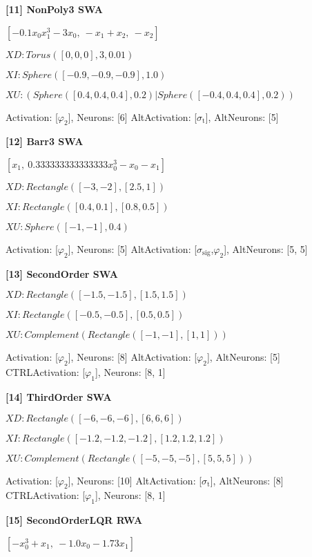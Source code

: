 \textbf{ [11] NonPoly3 SWA }

$\left[ - 0.1 x_{0} x_{1}^{3} - 3 x_{0}, \  - x_{1} + x_{2}, \  - x_{2}\right]$ 
 
 $XD: Torus([0, 0, 0], 3, 0.01) $

$XI: Sphere([-0.9, -0.9, -0.9], 1.0) $

$XU: (Sphere([0.4, 0.4, 0.4], 0.2) | Sphere([-0.4, 0.4, 0.4], 0.2)) $


Activation: [$\varphi_{2}$], Neurons: [6]
AltActivation: [$\sigma_{\mathrm{t}}$], AltNeurons: [5]

\textbf{ [12] Barr3 SWA }

$\left[ x_{1}, \  0.333333333333333 x_{0}^{3} - x_{0} - x_{1}\right]$ 
 
 $XD: Rectangle([-3, -2], [2.5, 1]) $

$XI: Rectangle([0.4, 0.1], [0.8, 0.5]) $

$XU: Sphere([-1, -1], 0.4) $


Activation: [$\varphi_{2}$], Neurons: [5]
AltActivation: [$\sigma_{\mathrm{sig}}$,$\varphi_{2}$], AltNeurons: [5, 5]

\textbf{ [13] SecondOrder SWA }

\left[ - x_{0}^{3} + x_{1}, \  u_{0}\right] 
 
 $XD: Rectangle([-1.5, -1.5], [1.5, 1.5]) $

$XI: Rectangle([-0.5, -0.5], [0.5, 0.5]) $

$XU: Complement(Rectangle([-1, -1], [1, 1])) $


Activation: [$\varphi_{2}$], Neurons: [8]
AltActivation: [$\varphi_{2}$], AltNeurons: [5]
CTRLActivation: [$\varphi_{1}$], Neurons: [8, 1]

\textbf{ [14] ThirdOrder SWA }

\left[ u_{0} - 10 x_{0} + 10 x_{1}, \  - x_{0} x_{2} + 28 x_{0} - x_{1}, \  x_{0} x_{1} - 2.66666666666667 x_{2}\right] 
 
 $XD: Rectangle([-6, -6, -6], [6, 6, 6]) $

$XI: Rectangle([-1.2, -1.2, -1.2], [1.2, 1.2, 1.2]) $

$XU: Complement(Rectangle([-5, -5, -5], [5, 5, 5])) $


Activation: [$\varphi_{2}$], Neurons: [10]
AltActivation: [$\sigma_{\mathrm{t}}$], AltNeurons: [8]
CTRLActivation: [$\varphi_{1}$], Neurons: [8, 1]

\textbf{ [15] SecondOrderLQR RWA }

$\left[ - x_{0}^{3} + x_{1}, \  - 1.0 x_{0} - 1.73 x_{1}\right]$ 
 
